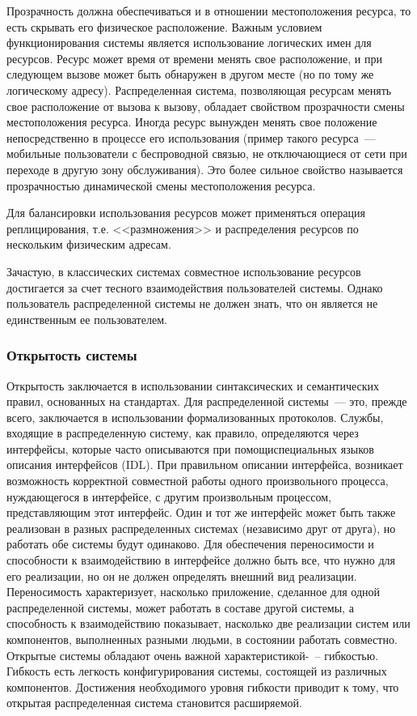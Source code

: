 Прозрачность должна обеспечиваться и в отношении местоположения ресурса, то есть скрывать его физическое расположение. Важным условием функционирования системы является использование логических имен для ресурсов. Ресурс может время от времени менять свое расположение, и при следующем вызове может быть обнаружен в другом месте (но по тому же логическому адресу). Распределенная система, позволяющая ресурсам менять свое расположение от вызова к вызову, обладает свойством прозрачности смены местоположения ресурса. Иногда ресурс вынужден менять свое положение непосредственно в процессе его использования (пример такого ресурса~--- мобильные пользователи с беспроводной связью, не отключающиеся от сети при переходе в другую зону обслуживания). Это более сильное свойство называется прозрачностью динамической смены местоположения ресурса.

Для балансировки использования ресурсов может применяться операция реплицирования, т.е. <<размножения>> и распределения ресурсов по нескольким физическим адресам.

Зачастую, в классических системах совместное использование ресурсов достигается за счет тесного взаимодействия пользователей системы. Однако пользователь распределенной системы не должен знать, что он является не единственным ее пользователем.

\subsubsection{Открытость системы}
Открытость заключается в использовании синтаксических и семантических правил, основанных на стандартах. Для распределенной системы~--- это, прежде всего, заключается в использовании формализованных протоколов. Службы, входящие в распределенную систему, как правило, определяются через интерфейсы, которые часто описываются при помощиспециальных языков описания интерфейсов (IDL). При правильном описании интерфейса, возникает возможность корректной совместной работы одного произвольного процесса, нуждающегося в интерфейсе, с другим произвольным процессом, представляющим этот интерфейс. Один и тот же интерфейс может быть также реализован в разных распределенных системах (независимо друг от друга), но работать обе системы будут одинаково. Для обеспечения переносимости и способности к взаимодействию в интерфейсе должно быть все, что нужно для его реализации, но он не должен определять внешний вид реализации. Переносимость характеризует, насколько приложение, сделанное для одной распределенной системы, может работать в составе другой системы, а способность к взаимодействию показывает, насколько две реализации систем или компонентов, выполненных разными людьми, в состоянии работать совместно. Открытые системы обладают очень важной характеристикой-~-- гибкостью. Гибкость есть легкость конфигурирования системы, состоящей из различных компонентов. Достижения необходимого уровня гибкости приводит к тому, что открытая распределенная система становится расширяемой.

